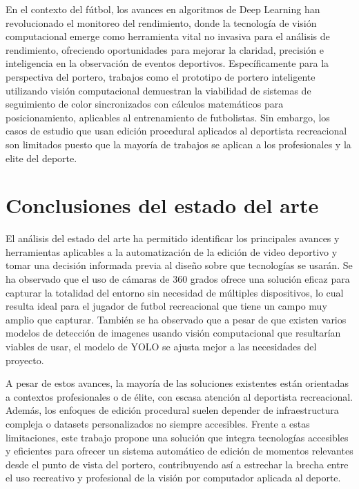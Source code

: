 En el contexto del fútbol, los avances en algoritmos de Deep Learning han revolucionado el monitoreo del rendimiento, donde la tecnología de visión computacional emerge como herramienta vital no invasiva para el análisis de rendimiento, ofreciendo oportunidades para mejorar la claridad, precisión e inteligencia en la observación de eventos deportivos. Específicamente para la perspectiva del portero, trabajos como el prototipo de portero inteligente \cite{prasetya2020} utilizando visión computacional demuestran la viabilidad de sistemas de seguimiento de color sincronizados con cálculos matemáticos para posicionamiento, aplicables al entrenamiento de futbolistas. Sin embargo, los casos de estudio que usan edición procedural aplicados al deportista recreacional son limitados puesto que la mayoría de trabajos se aplican a los profesionales y la elite del deporte.

\section[Conclusiones]{Conclusiones del estado del arte}

El análisis del estado del arte ha permitido identificar los principales avances y herramientas aplicables a la automatización de la edición de video deportivo y tomar una decisión informada previa al diseño sobre que tecnologías se usarán. Se ha observado que el uso de cámaras de 360 grados ofrece una solución eficaz para capturar la totalidad del entorno sin necesidad de múltiples dispositivos, lo cual resulta ideal para el jugador de futbol recreacional que tiene un campo muy amplio que capturar. También se ha observado que a pesar de que existen varios modelos de detección de imagenes usando visión computacional que resultarían viables de usar, el modelo de YOLO se ajusta mejor a las necesidades del proyecto.

A pesar de estos avances, la mayoría de las soluciones existentes están orientadas a contextos profesionales o de élite, con escasa atención al deportista recreacional. Además, los enfoques de edición procedural suelen depender de infraestructura compleja o datasets personalizados no siempre accesibles. Frente a estas limitaciones, este trabajo propone una solución que integra tecnologías accesibles y eficientes para ofrecer un sistema automático de edición de momentos relevantes desde el punto de vista del portero, contribuyendo así a estrechar la brecha entre el uso recreativo y profesional de la visión por computador aplicada al deporte.
